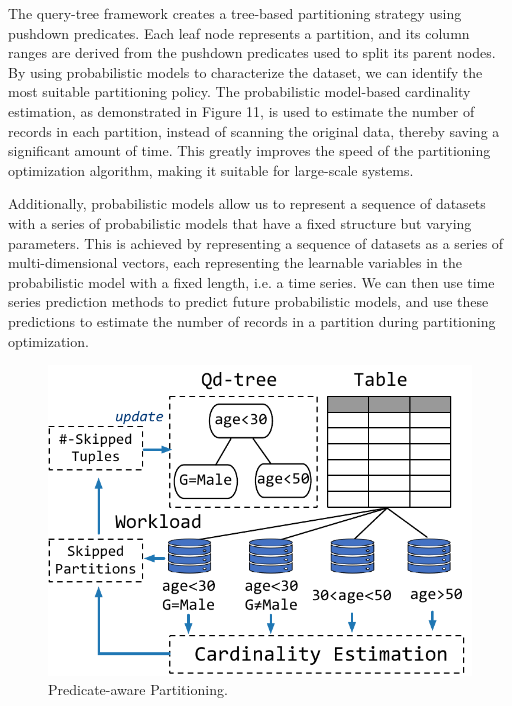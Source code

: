 

The query-tree framework creates a tree-based partitioning strategy using pushdown predicates. Each leaf node represents a partition, and its column ranges are derived from the pushdown predicates used to split its parent nodes.
 By using probabilistic models to characterize the dataset, we can identify the most suitable partitioning policy. The probabilistic model-based cardinality estimation, as demonstrated in Figure 11, is used to estimate the number of records in each partition,  instead of scanning the original data, thereby saving a significant amount of time. This greatly improves the speed of the partitioning optimization algorithm, making it suitable for large-scale systems.

Additionally, probabilistic models allow us to represent a sequence of datasets with a series of probabilistic models that have a fixed structure but varying parameters. This is achieved by representing a sequence of datasets as a series of multi-dimensional vectors, each representing the learnable variables in the probabilistic model with a fixed length, i.e. a time series. We can then use time series prediction methods to predict future probabilistic models, and use these predictions to estimate the number of records in a partition during partitioning optimization.


\begin{figure}[htbp]
	\includegraphics[scale=0.6]{figures/partition}
	\centering
	\vspace{-1em}
	\caption{Predicate-aware Partitioning.}
	\label{fig:partition}
	\vspace{-1em}
\end{figure}


